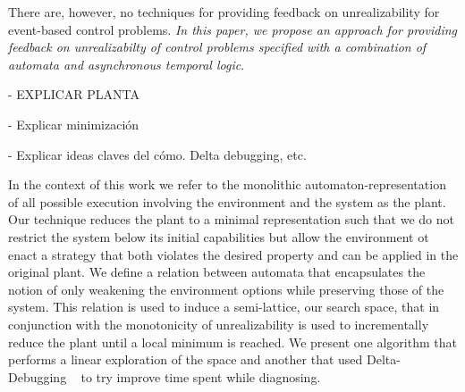 There are, however, no techniques for providing feedback on unrealizability for 
event-based control problems. \emph{In this paper, we propose an approach for  
providing  feedback on unrealizabilty of control problems specified with a combination of 
automata and asynchronous temporal logic}.

- EXPLICAR PLANTA

- Explicar minimización

- Explicar ideas claves del cómo. Delta debugging, etc.

In the context of this work we refer to the monolithic automaton-representation of all possible execution involving the environment and the system as the plant. Our technique reduces the plant to a minimal representation such that we do not restrict the system below its initial capabilities but allow the environment ot enact a strategy that both violates the desired property and can be applied in the original plant. We define a relation between automata that encapsulates the notion of only weakening the environment options while preserving those of the system. This relation is used to induce a semi-lattice, our search space, that in conjunction with the monotonicity of unrealizability is used to incrementally reduce the plant until a local minimum is reached. We present one algorithm that performs a linear exploration of the space and another that used Delta-Debugging ~\cite{DBLP:journals/tse/ZellerH02} to try improve time spent while diagnosing.


